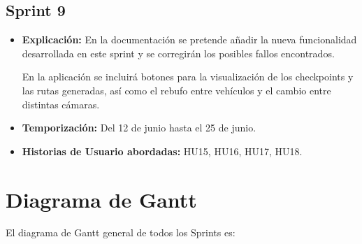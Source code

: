 \subsection{Sprint 9}

\begin{itemize}
    \item \textbf{Explicación:} En la documentación se pretende añadir la nueva funcionalidad desarrollada en este sprint y se corregirán los posibles fallos encontrados.
    
    En la aplicación se incluirá botones para la visualización de los checkpoints y las rutas generadas, así como el rebufo entre vehículos y el cambio entre distintas cámaras.

    \item \textbf{Temporización:} Del 12 de junio hasta el 25 de junio.
    \item \textbf{Historias de Usuario abordadas:} HU15, HU16, HU17, HU18.
\end{itemize}


\newpage
\section{Diagrama de Gantt}

El diagrama de Gantt general de todos los Sprints es:


